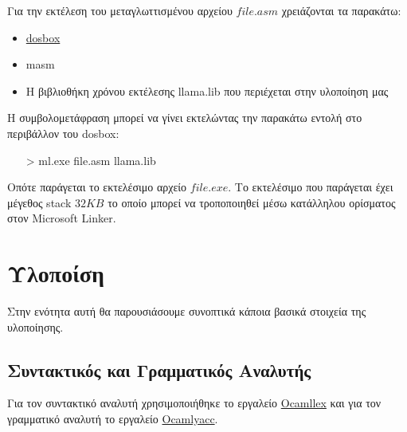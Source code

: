 \documentclass[12pt]{article}
\begin{document}
Για την εκτέλεση του μεταγλωττισμένου αρχείου $file.asm$ χρειάζονται τα παρακάτω:
\begin{itemize}
\item \href{http://www.dosbox.com/}{dosbox}
\item masm
\item Η βιβλιοθήκη χρόνου εκτέλεσης llama.lib που περιέχεται στην υλοποίηση μας
\end{itemize}

Η συμβολομετάφραση μπορεί να γίνει εκτελώντας την παρακάτω εντολή στο περιβάλλον του dosbox:
\begin{itemize}
\item[>] ml.exe file.asm llama.lib
\end{itemize} 
Οπότε παράγεται το εκτελέσιμο αρχείο $file.exe$.
Το εκτελέσιμο που παράγεται έχει μέγεθος stack $32KB$ το οποίο μπορεί να τροποποιηθεί μέσω κατάλληλου ορίσματος στον Microsoft Linker.
%
%
%
%
%
%
%
%
%
%
%    
%    
%
%
%
%
%
%	


\section{Υλοποίση}
Στην ενότητα αυτή θα παρουσιάσουμε συνοπτικά κάποια βασικά στοιχεία της υλοποίησης.
\subsection{Συντακτικός και Γραμματικός Αναλυτής}
Για τον συντακτικό αναλυτή χρησιμοποιήθηκε το εργαλείο \href{http://courses.softlab.ntua.gr/compilers/2012a/ocamlyacc-tutorial.pdf}{Ocamllex} και για τον γραμματικό     αναλυτή το εργαλείο \href{http://courses.softlab.ntua.gr/compilers/2012a/ocamlyacc-tutorial.pdf}{Ocamlyacc}.
\end{document}
